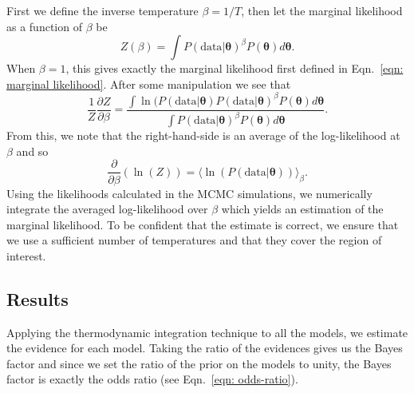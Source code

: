 \documentclass[../full_thesis/full_thesis.tex]{subfiles}
\newcommand{\data}{\textrm{data}}
\newcommand{\params}{\boldsymbol{\theta}}
\begin{document}
First we define the inverse temperature $\beta = 1/T$, then let the marginal
likelihood as a function of $\beta$ be
\begin{equation}
Z(\beta) = \int P(\data| \params)^{\beta}P(\params) d\params.
\end{equation}
When $\beta=1$, this gives exactly the marginal likelihood first defined in
Eqn.~\eqref{eqn: marginal likelihood}.
After some manipulation we see that
\begin{equation}
\frac{1}{Z} \frac{\partial Z}{\partial \beta} =
\frac{
\int \ln(P(\data| \params) P(\data| \params)^{\beta}P(\params) d\params}
{\int P(\data| \params)^{\beta}P(\params) d\params}.
\end{equation}
From this, we note that the right-hand-side is an average of the log-likelihood
at $\beta$ and so
\begin{equation}
\frac{\partial}{\partial\beta}\left(\ln(Z)\right) =
\langle \ln(P(\data| \params))\rangle_\beta.
\end{equation}
Using the likelihoods calculated in the MCMC simulations, we numerically
integrate the averaged log-likelihood over $\beta$ which yields an estimation
of the marginal likelihood. To be confident that the estimate is correct, we
ensure that we use a sufficient number of temperatures and that they cover the
region of interest.

\subsection{Results}
Applying the thermodynamic integration technique to all the models, we estimate
the evidence for each model. Taking the ratio of the evidences gives us the
Bayes factor and since we set the ratio of the prior on the models to unity,
the Bayes factor is exactly the odds ratio (see Eqn.~\eqref{eqn: odds-ratio}).
\end{document}
